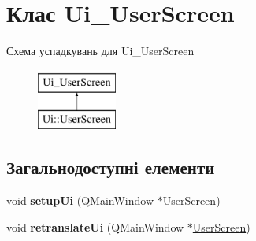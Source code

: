 \hypertarget{classUi__UserScreen}{\section{Клас Ui\-\_\-\-User\-Screen}
\label{classUi__UserScreen}
}
Схема успадкувань для Ui\-\_\-\-User\-Screen\begin{figure}[H]
\begin{center}
\leavevmode
\includegraphics[height=2.000000cm]{classUi__UserScreen}
\end{center}
\end{figure}
\subsection*{Загальнодоступні елементи}
\begin{DoxyCompactItemize}
\item 
\hypertarget{classUi__UserScreen_a54b3d739bdce488848cf19068dfe164e}{void {\bfseries setup\-Ui} (Q\-Main\-Window $\ast$\hyperlink{classUserScreen}{User\-Screen})}\label{classUi__UserScreen_a54b3d739bdce488848cf19068dfe164e}

\item 
\hypertarget{classUi__UserScreen_aeadabe075b2171763d186a2ceaf61314}{void {\bfseries retranslate\-Ui} (Q\-Main\-Window $\ast$\hyperlink{classUserScreen}{User\-Screen})}\label{classUi__UserScreen_aeadabe075b2171763d186a2ceaf61314}

\end{DoxyCompactItemize}
